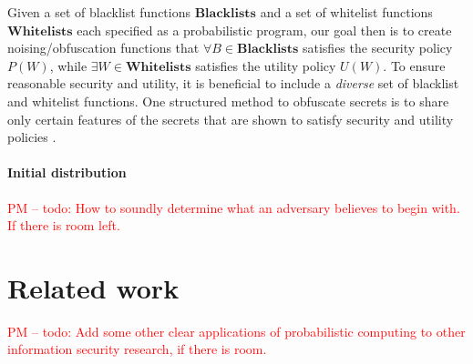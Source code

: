 \documentclass{article} %
\newcommand{\pxm}[1]{\textcolor{red}{PM -- #1}}
\newcommand{\blacklists}[0]{\textbf{Blacklists}}
\newcommand{\whitelists}[0]{\textbf{Whitelists}}
\theoremstyle{plain} %
\theoremstyle{definition} %
\begin{document}
Given a set of blacklist functions $\blacklists$ and a set of whitelist functions
$\whitelists$ each specified as a probabilistic program, our goal then is to create
noising/obfuscation functions that $ \forall B \in \blacklists $ satisfies the security
policy $ P(W) $, while $ \exists W \in \whitelists $ satisfies the utility policy $ U(W) $.
To ensure reasonable security and utility, it is beneficial to include a \emph{diverse} set of
blacklist and whitelist functions. One structured method to obfuscate secrets is to 
share only certain features of the secrets that are shown to satisfy security and utility
policies \cite{chakraborty12balancing}.


\paragraph*{Initial distribution}

\pxm{todo: How to soundly determine what an adversary believes to begin
  with. If there is room left.}

\section*{Related work} \pxm{todo: Add some other clear applications
  of probabilistic computing to other information security research,
  if there is room.}





\end{document}
